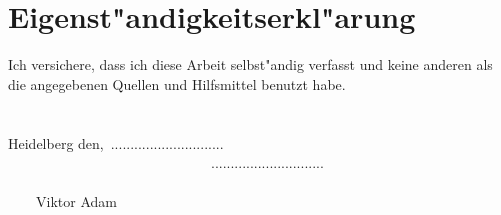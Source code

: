 

\thispagestyle{empty}

\section*{Eigenst"andigkeitserkl"arung}

Ich versichere, dass ich diese Arbeit selbst"andig verfasst und keine anderen als die angegebenen
Quellen und Hilfsmittel benutzt habe. \\ \\ \\

Heidelberg den,\ .............................     \ \ \ \ \ \ \ \ \ \ \ \ \ \ \ \ \ \ \ \ \ \ \ \ \ \ \ \ \  ............................. \\

\ \ \ \ \ \ \ \ \ \ \ \ \ \ \ \ \ \ \ \ \ \ \ \ \ \ \ \ \ \ \ \ \ \ \ \ \ \ \ \ \ \ \ \ \ \ \ \ \ \  \ \ \ \ \ \ \ \ \ \ \ \ \ \ \ \ \ \ \ \ \ \ \ \  \ \  Viktor Adam



\cleardoublepage
\thispagestyle{empty}
